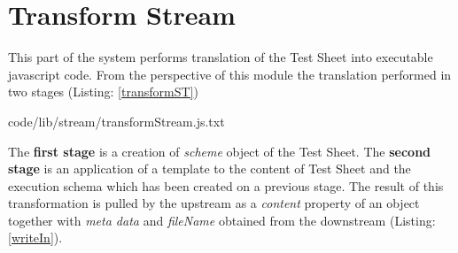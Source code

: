 %
%


\section{Transform Stream}
\label{sec:transform}
This part of the system performs translation of the Test Sheet into executable javascript code. From the perspective of this module the translation performed in two stages (Listing: \ref{transformST}) 



{code/lib/stream/transformStream.js.txt}

The\textbf{ first stage} is a creation of \textit{scheme} object of the Test Sheet. The \textbf{second stage} is an application of a template to the content of Test Sheet and the execution schema which has been created on a previous stage. The result of this transformation is pulled by the upstream as a \textit{content} property of an object together with \textit{meta data} and \textit{fileName} obtained from the downstream (Listing: \ref{writeIn}).

